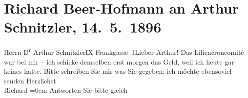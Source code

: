 

         
         \renewcommand{\erwaehntePersonen}{Personen: Detlev von Liliencron}
         \renewcommand{\erwaehnteOrte}{Orte: Frankgasse, I., Innere Stadt, IX., Alsergrund, Wien}
         \renewcommand{\erwaehnteWerke}{}
               \section[Richard Beer-Hofmann an Arthur Schnitzler, 14. 5. 1896]{ Richard Beer-Hofmann an Arthur Schnitzler, 14. 5. 1896}\nopagebreak{}\rehead{ }\begin{ledgroupsized}[t]{13cm}\normalsize\beginnumbering \toendnotes[C]{\smallbreak\pagebreak[2]} 
\pstart{}{\pb}Herrn D\textsuperscript{r} Arthur Schnitzler\pend{}\pstart{}IX Frankgasse 1\pend{}{\bigskip}\pstart{}{\pb}Lieber Arthur!\pend\pstart
           Das Liliencroncomité war bei mir – ich schicke
                   demselben erst morgen das Geld, weil ich heute
               gar keines hatte. Bitte schreiben Sie mir was Sie gegeben; ich möchte ebensoviel
               senden\pend
           \pstart
           Herzlichst{\\[\baselineskip]}\spacefill\mbox{Richard}\pend
           \leftskip=0em{}\pstart
           \noindent{}Antworten Sie bitte gleich\pend
           
         
         \endnumbering{}\end{ledgroupsized}  \newcommand{\dateiname}{L00543}\newcommand{\titel}{Richard Beer-Hofmann an Arthur Schnitzler, 14. 5. 1896}\newcommand{\editorInnen}{Martin Anton Müller und Gerd-Hermann Susen}
      